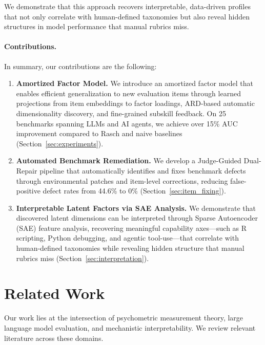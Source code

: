 \documentclass{article}
\theoremstyle{plain}
\theoremstyle{definition}
\theoremstyle{remark}
\begin{document}
We demonstrate that this approach recovers interpretable, data-driven profiles that not only correlate with human-defined taxonomies but also reveal hidden structures in model performance that manual rubrics miss.

\paragraph{Contributions.} In summary, our contributions are the following:
\begin{enumerate}
    \item \textbf{Amortized Factor Model.} We introduce an amortized factor model that enables efficient generalization to new evaluation items through learned projections from item embeddings to factor loadings, ARD-based automatic dimensionality discovery, and fine-grained subskill feedback. On 25 benchmarks spanning LLMs and AI agents, we achieve over 15\% AUC improvement compared to Rasch and naive baselines (Section~\ref{sec:experiments}).

    \item \textbf{Automated Benchmark Remediation.} We develop a Judge-Guided Dual-Repair pipeline that automatically identifies and fixes benchmark defects through environmental patches and item-level corrections, reducing false-positive defect rates from 44.6\% to 0\% (Section~\ref{sec:item_fixing}).

    \item \textbf{Interpretable Latent Factors via SAE Analysis.} We demonstrate that discovered latent dimensions can be interpreted through Sparse Autoencoder (SAE) feature analysis, recovering meaningful capability axes---such as R scripting, Python debugging, and agentic tool-use---that correlate with human-defined taxonomies while revealing hidden structure that manual rubrics miss (Section~\ref{sec:interpretation}).
\end{enumerate}

\section{Related Work}

Our work lies at the intersection of psychometric measurement theory, large language model evaluation, and mechanistic interpretability. We review relevant literature across these domains.
\end{document}
